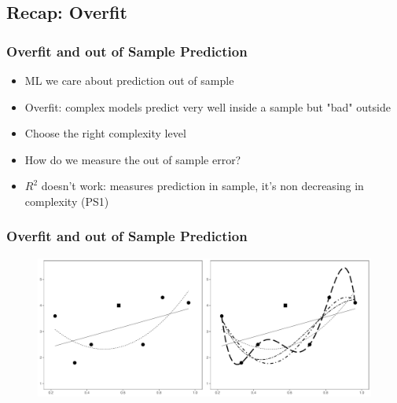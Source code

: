 \documentclass[
  shownotes,
  xcolor={svgnames},
  hyperref={colorlinks,citecolor=DarkBlue,linkcolor=DarkRed,urlcolor=DarkBlue}
  ]{beamer}
\begin{document}
\subsection{Recap: Overfit }
\begin{frame}[fragile]
\frametitle{Overfit and out of Sample Prediction}


\begin{itemize}
  \item ML we care about prediction out of sample
  \medskip
  \item Overfit: complex models predict very well inside a sample but "bad" outside
  \medskip
  \item Choose the right complexity level
  \medskip
  \item How do we measure the out of sample error?
  \medskip
  \item $R^2$ doesn't work: measures prediction in sample, it's non decreasing in complexity (PS1)
\end{itemize}

\end{frame}
\begin{frame}[fragile]
\frametitle{Overfit and out of Sample Prediction}


        \begin{figure}[H] \centering
            \captionsetup{justification=centering}
              \includegraphics[scale=0.4]{figures/Fig0}
 \end{figure}

\end{frame}
\end{document}
